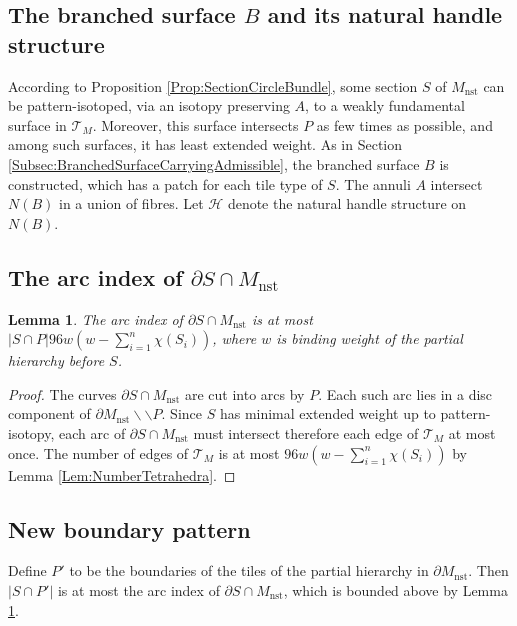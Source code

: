\documentclass[oneside]{amsart}
\numberwithin{equation}{section}
\theoremstyle{plain}
\newtheorem{lemma}[equation]{Lemma}
\theoremstyle{definition}
\newcommand{\cut}{\backslash\backslash}
\begin{document}
\subsection{The branched surface $B$ and its natural handle structure}

According to Proposition \ref{Prop:SectionCircleBundle}, some section $S$ of $M_{\text{nst}}$ 
can be pattern-isotoped, via an isotopy preserving $A$, to a weakly fundamental surface
in $\mathcal{T}_M$. Moreover, this surface intersects $P$ as few times as possible,
and among such surfaces, it has least extended weight. As in Section \ref{Subsec:BranchedSurfaceCarryingAdmissible}, the branched
surface $B$ is constructed, which has a patch for each tile type of $S$. The annuli
$A$ intersect $N(B)$ in a union of fibres. Let $\mathcal{H}$ denote the natural handle
structure on $N(B)$. 


\subsection{The arc index of $\partial S \cap M_{\textrm{nst}}$}

\begin{lemma}
\label{Lem:ArcIndexBoundary}
The arc index of $\partial S \cap M_{\textrm{nst}}$ is at most $|S \cap P| 96 w (w - \sum_{i=1}^n \chi(S_i))$, where $w$ is binding
weight of the partial hierarchy before $S$.
\end{lemma}

\begin{proof}
The curves $\partial S \cap M_{\textrm{nst}}$ are cut into arcs by $P$. Each such arc lies in a disc component of $\partial M_{\textrm{nst}} \cut P$.
Since $S$ has minimal extended weight up to pattern-isotopy, each arc
of $\partial S \cap M_{\textrm{nst}}$ must intersect therefore each edge of $\mathcal{T}_M$ at most once.
The number of edges of $\mathcal{T}_M$ is at most $96 w (w - \sum_{i=1}^n \chi(S_i))$
by Lemma \ref{Lem:NumberTetrahedra}. 
\end{proof}

\subsection{New boundary pattern}

Define $P'$ to be the boundaries of the tiles of the partial hierarchy in $\partial M_{\textrm{nst}}$. Then $|S \cap P'|$ is at most the arc
index of $\partial S \cap M_{\textrm{nst}}$, which is bounded above by Lemma \ref{Lem:ArcIndexBoundary}.
\end{document}
